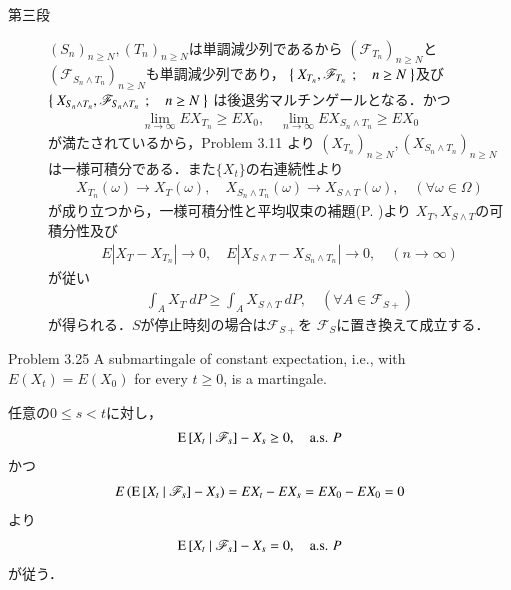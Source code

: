 \begin{prf}
\begin{description}
			\item[第三段]
				$(S_n)_{n \geq N},(T_n)_{n \geq N}$は単調減少列であるから
				$\left( \mathscr{F}_{T_n} \right)_{n \geq N}$と
				$\left( \mathscr{F}_{S_n \wedge T_n} \right)_{n \geq N}$も単調減少列であり，
				$\left\{\ X_{T_n},\mathscr{F}_{T_n}\ \, ; \quad n \geq N\ \right\}$及び
				$\left\{\ X_{S_n \wedge T_n},\mathscr{F}_{S_n \wedge T_n}\ \, ; \quad n \geq N\ \right\}$
				は後退劣マルチンゲールとなる．かつ
				\begin{align}
					\lim_{n \to \infty} EX_{T_n} \geq EX_0,
					\quad \lim_{n \to \infty} EX_{S_n \wedge T_n} \geq EX_0
				\end{align}
				が満たされているから，Problem 3.11 より
				$\left( X_{T_n} \right)_{n \geq N},\left( X_{S_n \wedge T_n} \right)_{n \geq N}$
				は一様可積分である．また$\{X_t\}$の右連続性より
				\begin{align}
					X_{T_n}(\omega) \longrightarrow X_T(\omega),
					\quad X_{S_n \wedge T_n}(\omega) \longrightarrow X_{S \wedge T}(\omega),
					\quad (\forall \omega \in \Omega)
				\end{align}
				が成り立つから，一様可積分性と平均収束の補題(P. \pageref{lem:uniformly_integrable_and_convergence_in_mean})より
				$X_T,X_{S \wedge T}$の可積分性及び
				\begin{align}
					E\left| X_T - X_{T_n} \right| \longrightarrow 0,
					\quad E\left| X_{S \wedge T} - X_{S_n \wedge T_n} \right| \longrightarrow 0,
					\quad (n \longrightarrow \infty)
				\end{align}
				が従い
				\begin{align}
					\int_A X_T\ dP \geq \int_A X_{S \wedge T}\ dP,
					\quad (\forall A \in \mathscr{F}_{S+})
				\end{align}
				が得られる．$S$が停止時刻の場合は$\mathscr{F}_{S+}$を
				$\mathscr{F}_S$に置き換えて成立する．
				\QED
		\end{description}
	\end{prf}
	
	\begin{itembox}[l]{Problem 3.25}
		A submartingale of constant expectation, i.e., with $E(X_t) = E(X_0)$ for every $t \geq 0$, is a martingale. 
	\end{itembox}
	
	\begin{prf}
		任意の$0 \leq s < t$に対し，
		\begin{align}
			\operatorname{E} \left[ X_t \ \middle|\ \mathscr{F}_s \right] - X_s \geq 0,
			\quad \mbox{a.s. $P$}
		\end{align}
		かつ
		\begin{align}
			E\left( \operatorname{E} \left[ X_t \ \middle|\ \mathscr{F}_s \right] - X_s \right)
			= EX_t - EX_s
			= EX_0 - EX_0
			= 0
		\end{align}
		より
		\begin{align}
			\operatorname{E} \left[ X_t \ \middle|\ \mathscr{F}_s \right] - X_s = 0,
			\quad \mbox{a.s. $P$}
		\end{align}
		が従う．
		\QED
	\end{prf}
	

